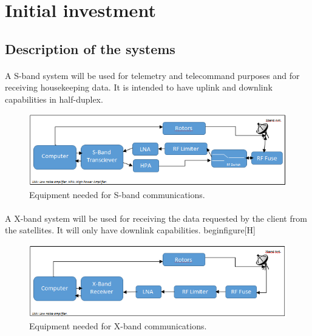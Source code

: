 \section{Initial investment}

\subsection{Description of the systems}

\paragraph{}A S-band system will be used for telemetry and telecommand purposes and for receiving housekeeping data. It is intended to have uplink and downlink capabilities in half-duplex.
\begin{figure}[H]
\begin{center}
\includegraphics[scale=1]{SbandEquip.PNG}
\caption[S-band Equipment]{Equipment needed for S-band communications.}
\label{fig:SbandEquip}
\end{center}
\end{figure}

\paragraph{}A X-band system will be used for receiving the data requested by the client from the satellites. It will only have downlink capabilities.
begin{figure}[H]
\begin{figure}[H]
\begin{center}
\includegraphics[scale=1]{XbandEquip.PNG}
\caption[X-band Equipment]{Equipment needed for X-band communications.}
\label{fig:XbandEquip}
\end{center}
\end{figure}

